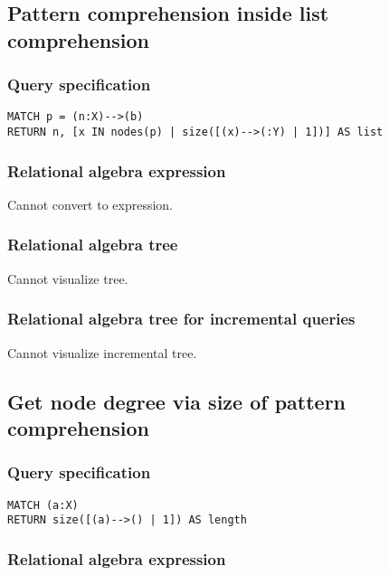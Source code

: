 \subsection{Pattern comprehension inside list comprehension}

\subsubsection*{Query specification}

\begin{lstlisting}
MATCH p = (n:X)-->(b)
RETURN n, [x IN nodes(p) | size([(x)-->(:Y) | 1])] AS list
\end{lstlisting}

\subsubsection*{Relational algebra expression}

Cannot convert to expression.

\subsubsection*{Relational algebra tree}

Cannot visualize tree.

\subsubsection*{Relational algebra tree for incremental queries}

Cannot visualize incremental tree.

\subsection{Get node degree via size of pattern comprehension}

\subsubsection*{Query specification}

\begin{lstlisting}
MATCH (a:X)
RETURN size([(a)-->() | 1]) AS length
\end{lstlisting}

\subsubsection*{Relational algebra expression}

